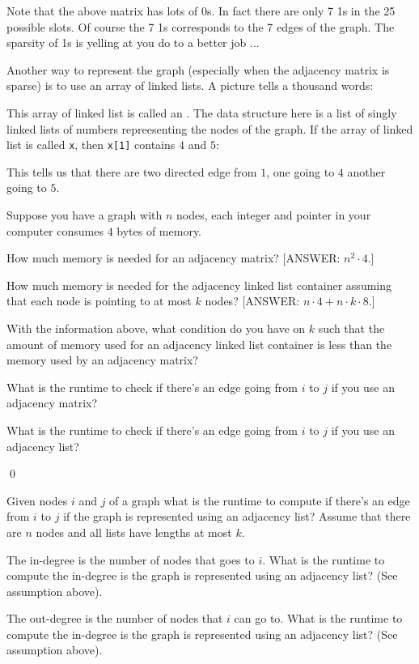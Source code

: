 Note that the above matrix has lots of 0s.
In fact there are only 7 1s in the 25 possible slots.
Of course the 7 1s corresponds to the 7 edges of the graph.
The sparsity of 1s is yelling at you do to a better job ...

Another way to represent the graph (especially when the
adjacency matrix is sparse) is to use an array of linked lists.
A picture tells a thousand words:



This array of linked list is called an .
The data structure here is a list of singly linked lists of
numbers repreesenting the nodes of the graph.
If the array of linked list is called \verb!x!, then
\verb!x[1]! contains $4$ and $5$:



This tells us that there are two directed edge from $1$,
one going to $4$ another going to $5$.

\begin{ex}
Suppose you have a graph with $n$ nodes,
each integer and pointer in your computer consumes $4$ bytes of memory.
\begin{myenum}
  \item How much memory is needed for an adjacency matrix?
  [ANSWER: $n^2 \cdot 4$.]
  \item How much memory is needed for the adjacency linked list
  container assuming that each node is pointing to at most $k$ nodes?
  [ANSWER: $n \cdot 4 + n \cdot k \cdot 8$.]
  \item With the information above, what condition do you have on $k$
  such that the amount of memory used for an adjacency linked list
  container is less than the memory used by an adjacency matrix?
  \item What is the runtime to check if there's an edge going from $i$ to $j$
  if you use an adjacency matrix?
  \item What is the runtime to check if there's an edge going from $i$ to $j$
  if you use an adjacency list?
\end{myenum}
\qed
\end{ex}


\begin{ex}
\begin{myenum}
  \item Given nodes $i$ and $j$ of a graph what is the runtime to
  compute if there's an edge from $i$ to $j$ if the graph
  is represented using an adjacency list? Assume that
  there are $n$ nodes and all lists have lengths at most $k$.
  \item The in-degree is the number of nodes that goes to $i$.
  What is the runtime to compute the in-degree is the
  graph is represented using an adjacency list?
  (See assumption above).
  \item The out-degree is the number of nodes that $i$ can go to.
  What is the runtime to compute the in-degree is the
  graph is represented using an adjacency list?
  (See assumption above).
\end{myenum}
\end{ex}
